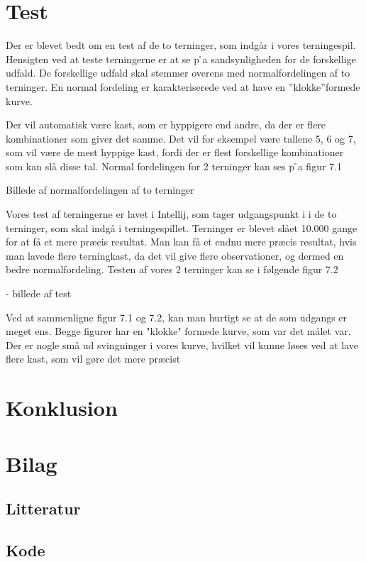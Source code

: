 \documentclass{article}
\begin{document}
\section{Test}
Der er blevet bedt om en test af de to terninger, som indgår i vores terningespil. Hensigten ved at teste terningerne er at se p ̊a sandsynligheden for de forskellige udfald. De forskellige udfald skal stemmer overens med normalfordelingen af to terninger. En normal fordeling er karakteriserede ved at have en ”klokke”formede kurve. 

Der vil automatisk være kast, som er hyppigere end andre, da der er flere kombinationer som giver det samme. Det vil for eksempel være tallene 5, 6 og 7, som vil være de mest hyppige kast, fordi der er flest forskellige kombinationer som kan slå disse tal. Normal fordelingen for 2 terninger kan ses p ̊a figur 7.1


Billede af normalfordelingen af to terninger


Vores test af terningerne er lavet i Intellij, som tager udgangspunkt i i de to terninger, som skal indgå i terningespillet. Terninger er blevet slået 10.000 gange for at få et mere præcis resultat. Man kan få et endnu mere præcis resultat, hvis man lavede flere terningkast, da det vil give flere observationer, og dermed en bedre normalfordeling.
Testen af vores 2 terninger kan se i følgende figur 7.2

- billede af test


Ved at sammenligne figur 7.1 og 7.2, kan man hurtigt se at de som udgangs er meget ens. Begge figurer har en "klokke" formede kurve, som var det målet var. Der er nogle små ud svingninger i vores kurve, hvilket vil kunne løses ved at lave flere kast, som vil gøre det mere præcist 


\section{Konklusion}

\section{Bilag}
\subsection{Litteratur}
\subsection{Kode}
\end{document}
